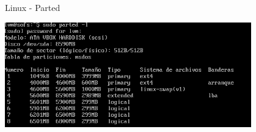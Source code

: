 \begin{frame}{Linux - Parted}
 \begin{center}
  \includegraphics[width=0.8\textwidth]{images/parted5.png}
 \end{center}
\end{frame}



